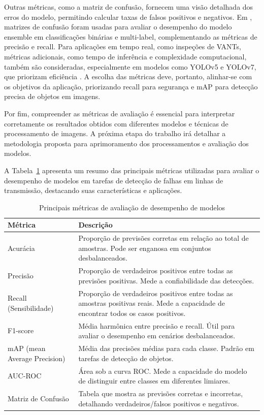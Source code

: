 Outras métricas, como a matriz de confusão, fornecem uma visão detalhada dos erros do modelo, permitindo calcular taxas de falsos positivos e negativos. Em , matrizes de confusão foram usadas para avaliar o desempenho do modelo ensemble em classificações binárias e multi-label, complementando as métricas de precisão e recall. Para aplicações em tempo real, como inspeções de VANTs, métricas adicionais, como tempo de inferência e complexidade computacional, também são consideradas, especialmente em modelos como YOLOv5 e YOLOv7, que priorizam eficiência \cite{peng2023edf}. A escolha das métricas deve, portanto, alinhar-se com os objetivos da aplicação, priorizando recall para segurança e mAP para detecção precisa de objetos em imagens.

Por fim, compreender as métricas de avaliação é essencial para interpretar corretamente os resultados obtidos com diferentes modelos e técnicas de processamento de imagens. A próxima etapa do trabalho irá detalhar a metodologia proposta para aprimoramento dos processamentos e avaliação dos modelos.

A Tabela~\ref{tab:metricas_avaliacao_modelos} apresenta um resumo das principais métricas utilizadas para avaliar o desempenho de modelos em tarefas de detecção de falhas em linhas de transmissão, destacando suas características e aplicações.

\begin{table}[H]
\centering
\caption{Principais métricas de avaliação de desempenho de modelos}
\label{tab:metricas_avaliacao_modelos}
\begin{tabular}{|p{4.5cm}|p{10cm}|}
\hline
\textbf{Métrica} & \textbf{Descrição} \\
\hline
Acurácia & Proporção de previsões corretas em relação ao total de amostras. Pode ser enganosa em conjuntos desbalanceados. \\
\hline
Precisão & Proporção de verdadeiros positivos entre todas as previsões positivas. Mede a confiabilidade das detecções. \\
\hline
Recall (Sensibilidade) & Proporção de verdadeiros positivos entre todas as amostras positivas reais. Mede a capacidade de encontrar todos os casos positivos. \\
\hline
F1-score & Média harmônica entre precisão e recall. Útil para avaliar o desempenho em cenários desbalanceados. \\
\hline
mAP (mean Average Precision) & Média das precisões médias para cada classe. Padrão em tarefas de detecção de objetos. \\
\hline
AUC-ROC & Área sob a curva ROC. Mede a capacidade do modelo de distinguir entre classes em diferentes limiares. \\
\hline
Matriz de Confusão & Tabela que mostra as previsões corretas e incorretas, detalhando verdadeiros/falsos positivos e negativos. \\
\hline
\end{tabular}
\end{table}
